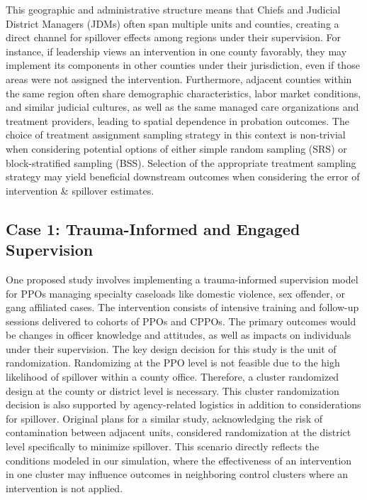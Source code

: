 \documentclass{article}[11pt]
\begin{document}
This geographic and administrative structure means that Chiefs and Judicial District Managers (JDMs) often span multiple units and counties, creating a direct channel for spillover effects among regions under their supervision. For instance, if leadership views an intervention in one county favorably, they may implement its components in other counties under their jurisdiction, even if those areas were not assigned the intervention. Furthermore, adjacent counties within the same region often share demographic characteristics, labor market conditions, and similar judicial cultures, as well as the same managed care organizations and treatment providers, leading to spatial dependence in probation outcomes. The choice of treatment assignment sampling strategy in this context is non-trivial when considering potential options of either simple random sampling (SRS) or block-stratified sampling (BSS). Selection of the appropriate treatment sampling strategy may yield beneficial downstream outcomes when considering the error of intervention \& spillover estimates.

\subsection{Case 1: Trauma-Informed and Engaged Supervision}

One proposed study involves implementing a trauma-informed supervision model for PPOs managing specialty caseloads like domestic violence, sex offender, or gang affiliated cases. The intervention consists of intensive training and follow-up sessions delivered to cohorts of PPOs and CPPOs. The primary outcomes would be changes in officer knowledge and attitudes, as well as impacts on individuals under their supervision. The key design decision for this study is the unit of randomization. Randomizing at the PPO level is not feasible due to the high likelihood of spillover within a county office. Therefore, a cluster randomized design at the county or district level is necessary. This cluster randomization decision is also supported by agency-related logistics in addition to considerations for spillover. Original plans for a similar study, acknowledging the risk of contamination between adjacent units, considered randomization at the district level specifically to minimize spillover. This scenario directly reflects the conditions modeled in our simulation, where the effectiveness of an intervention in one cluster may influence outcomes in neighboring control clusters where an intervention is not applied.
\end{document}
